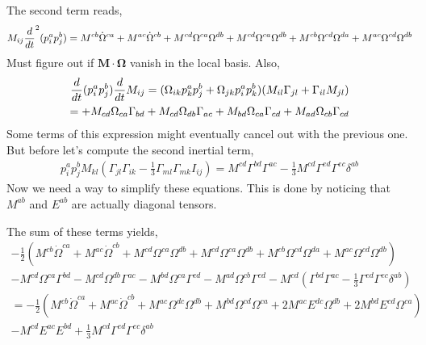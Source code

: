 The second term reads, 
\begin{align*}
    M_{ij} \frac{d}{d t}^2 (p_i^ap_j^b)
    = M^{cb} \dot{\Omega}^{ca}
    + M^{ac} \dot{\Omega}^{cb}
    + M^{cd} \Omega^{ca}\Omega^{db}
    + M^{cd} \Omega^{ca}\Omega^{db}
    + M^{cb} \Omega^{cd}\Omega^{da} 
    + M^{ac} \Omega^{cd}\Omega^{db} \\
\end{align*}
Must figure out if $\textbf{M}\cdot\bm\Omega$ vanish in the local basis. 
Also, 
\begin{align*}
    \frac{d}{d t} (p_i^ap_j^b) \frac{d}{d t} M_{ij}
    = 
    (\Omega_{ik} p_k^ap_j^b
    + \Omega_{jk} p_i^ap_k^b)
    (M_{il} \Gamma_{jl}
    +  \Gamma_{il} M_{jl})\\
    = 
    + M_{cd}\Omega_{ca} \Gamma_{bd}   
    + M_{cd}\Omega_{db} \Gamma_{ac}   
    + M_{bd}\Omega_{ca} \Gamma_{cd}  
    + M_{ad}\Omega_{cb}  \Gamma_{cd} 
\end{align*}
Some terms of this expression might eventually cancel out with the previous one.
But before let's compute the second inertial term, 
\begin{align*}
    p_i^a p_j^b M_{kl}( \Gamma_{jl}\Gamma_{ik} 
    - \frac{1}{3}
    \Gamma_{ml}\Gamma_{mk}  
    {I}_{ij})
    = 
    M^{cd} \Gamma^{bd}\Gamma^{ac} 
    - \frac{1}{3}
    M^{cd}\Gamma^{ed}\Gamma^{ec}  
    \delta^{ab}
\end{align*}
Now we need a way to simplify these equations. 
This is done by noticing that $M^{ab}$ and $E^{ab}$ are actually diagonal tensors. 

The sum of these terms yields, 
\begin{align*}
    - \frac{1}{2}(
    M^{cb} \dot{\Omega}^{ca}
    + M^{ac} \dot{\Omega}^{cb}
    + M^{cd} \Omega^{ca}\Omega^{db}
    + M^{cd} \Omega^{ca}\Omega^{db}
    + M^{cb} \Omega^{cd}\Omega^{da} 
    + M^{ac} \Omega^{cd}\Omega^{db}
)\\
    - M^{cd}\Omega^{ca} \Gamma^{bd}   
    - M^{cd}\Omega^{db} \Gamma^{ac}   
    - M^{bd}\Omega^{ca} \Gamma^{cd}  
    - M^{ad}\Omega^{cb}  \Gamma^{cd} 
    - M^{cd}( \Gamma^{bd}\Gamma^{ac} 
    - \frac{1}{3}
    \Gamma^{ed}\Gamma^{ec}  
    \delta^{ab})\\
    = 
    -\frac{1}{2}(
    M^{cb} \dot{\Omega}^{ca}
    + M^{ac} \dot{\Omega}^{cb}
    + M^{ac} \Omega^{dc} \Omega^{db}  
    + M^{bd} \Omega^{cd}  \Omega^{ca}
    + 2 M^{ac} E^{dc} \Omega^{db}  
    + 2 M^{bd} E^{cd} \Omega^{ca}
    )\\
    - M^{cd} E^{ac} E^{bd} 
    + \frac{1}{3} M^{cd}
    \Gamma^{ed}\Gamma^{ec}  
    \delta^{ab}
\end{align*}

